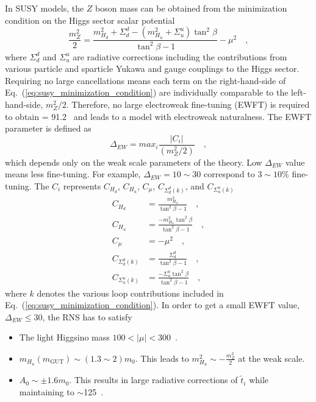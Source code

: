 In SUSY models, the $Z$ boson mass can be obtained from the minimization condition on the Higgs sector scalar potential
%
\begin{equation}
    \frac{m_{Z}^{2}}{2} = \frac{m^{2}_{H_{d}} + \Sigma^{d}_{d} - (m^{2}_{H_{u}} + \Sigma^{u}_{u})\tan^{2}\beta      }{\tan^{2}\beta - 1} - \mu^{2} \quad ,
    \label{eq:susy_minimization_condition}
\end{equation}
%
where $\Sigma^{d}_{d}$ and $\Sigma^{u}_{u}$ are radiative corrections including the contributions from various particle and sparticle Yukawa and gauge couplings to the Higgs sector.
Requiring no large cancellations means each term on the right-hand-side of Eq.~(\ref{eq:susy_minimization_condition}) are individually comparable to the left-hand-side, $m_{Z}^{2}/2$.
Therefore, no large electroweak fine-tuning (EWFT) is required to obtain \mZ = 91.2~{\GeV} and leads to a model with electroweak naturalness.
The EWFT parameter is defined as
%
\begin{equation}
    \Delta_{EW} =  max_{i} \frac{|C_{i}|}{(m_{Z}^{2}/2)} \quad ,
    \label{eq:susy_ewft}
\end{equation}
%
which depends only on the weak scale parameters of the theory.
Low $\Delta_{EW}$ value means less fine-tuning.
For example, $\Delta_{EW} = 10 \sim 30$ correspond to $3 \sim 10 \%$ fine-tuning.
The $C_{i}$ represents $C_{H_{d}}$, $C_{H_{u}}$, $C_{\mu}$, $C_{\Sigma^{d}_{d}(k)}$, and $C_{\Sigma^{u}_{u}(k)}$
%
\begin{align}
    C_{H_{d}} &= \frac{m^{2}_{H_{d}}}{\tan^{2}\beta - 1} \quad ,\\
    C_{H_{u}} &= \frac{-m^{2}_{H_{u}}\tan^{2}\beta}{\tan^{2}\beta - 1} \quad ,\\
    C_{\mu} &= -\mu^{2} \quad ,\\
    C_{\Sigma^{d}_{d}(k)} &= \frac{\Sigma^{d}_{d}}{\tan^{2}\beta - 1} \quad ,\\
    C_{\Sigma^{u}_{u}(k)} &= \frac{-\Sigma^{u}_{u}\tan^{2}\beta}{\tan^{2}\beta - 1} \quad ,
    \label{eq:susy_ci}
\end{align}
% 
where $k$ denotes the various loop contributions included in Eq.~(\ref{eq:susy_minimization_condition}).
In order to get a small EWFT value, $\Delta_{EW} \leq 30$, the RNS has to satisfy
%
\begin{itemize}
    \item The light Higgsino mass $100 < |\mu| < 300$~{\GeV}. 
    \item $m_{H_{u}}(m_{\text{GUT}}) \sim (1.3 \sim 2) m_{0}$. This leads to $m^{2}_{H_{u}} \sim - \frac{m^{2}_{Z}}{2}$ at the weak scale.
    \item $A_{0} \sim \pm 1.6 m_{0}$. This results in large radiative corrections of $\widetilde{t}_{i}$ while maintaining \mH to $\sim$125~{\GeV}.
\end{itemize}
